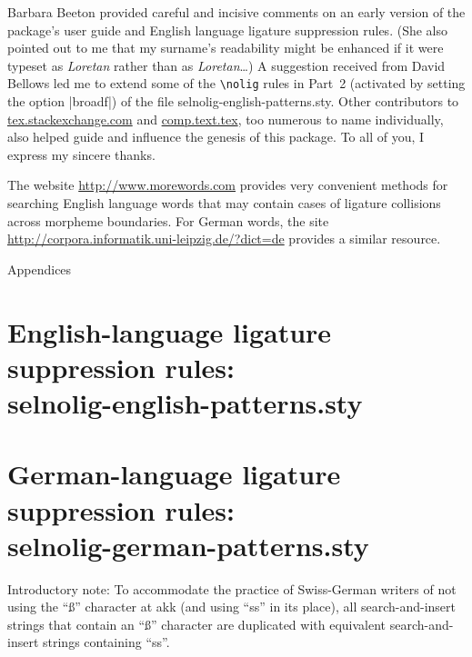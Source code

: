 \documentclass[11pt]{article}
\newcommand{\pkg}[1]{\textsf{#1}}
\newcommand{\cmmd}[1]{\texttt{\textbackslash #1}}
\let\oldappendix\appendix
\renewcommand\appendix{%
   \addtocontents{toc}{\protect{\vspace{1\baselineskip}}}
   \addtocontents{toc}{\protect{\mdseries Appendices\par}}
   \noindent
   {\Large Appendices}
   \oldappendix}
\begin{document}
Barbara Beeton provided careful and incisive comments on an early version of the package's user guide and English language ligature suppression rules. (She also pointed out to me that my surname's readability might be enhanced if it were typeset as \emph{Loretan} rather than as \emph{Lor\mbox{et}an}\dots) A suggestion received from David Bellows led me to extend some of the \cmmd{nolig} rules in Part~2 (activated by setting the option |broadf|) of the file \pkg{selnolig-english-patterns.sty}. Other contributors to \url{tex.stackexchange.com} and \url{comp.text.tex}, too numerous to name individually, also helped guide and influence the genesis of this package. To all of you, I express my sincere thanks.

The website \url{http://www.morewords.com} provides very convenient methods for searching English language words that may contain cases of ligature collisions across morpheme boundaries. For German words, the site \url{http://corpora.informatik.uni-leipzig.de/?dict=de} provides a similar resource. 



\clearpage
\appendix
\selnoligoff  %


\small %


\section[English-language ligature suppression rules: selnolig-english-patterns.sty]{English-language ligature suppression rules: \\ 
\pkg{selnolig-english-patterns.sty}}
\label{sec:eng-listing}

\begin{multicols}{2}
\end{multicols}

\clearpage
\section[German-language ligature suppression rules:
selnolig-german-patterns.sty]{German-language ligature suppression rules: \\ 
\pkg{selnolig-german-patterns.sty}}
\label{sec:germ-listing}

Introductory note: To accommodate the practice of Swiss-German writers of not using the \enquote{ß} character at akk (and using \enquote{ss} in its place), all search-and-insert strings that contain an \enquote{ß} character are duplicated with equivalent search-and-insert strings containing \enquote{ss}.
\end{document}
